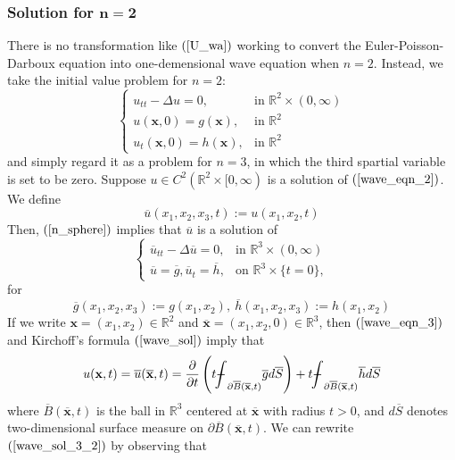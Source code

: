\documentclass[10pt]{article}
\def\rr{{\mathbb R}}
\def\vc{{\mathbf x}}
\def\so{{\overline u}}
\newcommand\tbbint{{-\mkern -16mu\int}}
\newcommand\dbbint{{-\mkern -19mu\int}}
\newcommand\bbint{
{\mathchoice{\dbbint}{\tbbint}{\tbbint}{\tbbint}}
}
\begin{document}
\subsubsection{Solution for $\mathbf{n=2}$}
There is no transformation like $(\ref{U_wa})$ working to convert the Euler-Poisson-Darboux equation into one-demensional wave equation when $n=2$. Instead, we take the initial value problem for $n=2$:
\begin{equation}
    \label{wave_eqn_2}
    \begin{cases}
        u_{tt} - \Delta u = 0, & \text{in } \rr^2 \times (0,\infty)\\
        u(\vc,0) = g(\vc), & \text{in } \rr^2\\
        u_t(\vc,0) = h(\vc), & \text{in } \rr^2
    \end{cases}
\end{equation}
and simply regard it as a problem for $n=3$, in which the third spartial variable is set to be zero. Suppose $u \in C^2(\rr^2 \times [0,\infty)$ is a solution of $(\ref{wave_eqn_2})$. We define
\begin{equation}
    \label{wave_sol_2}
    \so(x_1,x_2,x_3,t) := u(x_1,x_2,t)
\end{equation}
Then, $(\ref{n_sphere})$ implies that $\so$ is a solution of
\begin{equation}
    \label{wave_eqn_3}
    \begin{cases}
        \so_{tt} - \Delta \so = 0, & \text{in } \rr^3 \times (0,\infty)\\
        \so = \overline{g}, \so_t = \overline{h}, & \text{on } \rr^3 \times \{t=0\},
    \end{cases}
\end{equation}
for
\begin{equation*}
    \overline{g}(x_1,x_2,x_3) := g(x_1,x_2), \ \overline{h}(x_1,x_2,x_3) := h(x_1,x_2)
\end{equation*}
If we write $\vc = (x_1,x_2) \in \rr^2$ and $\overline{\vc}=(x_1,x_2,0) \in \rr^3$, then $(\ref{wave_eqn_3})$ and Kirchoff's formula $(\ref{wave_sol})$ imply that
\begin{equation}
    \label{wave_sol_3_2}
    u(\vc,t) = \so(\overline{\vc},t) = \frac{\partial }{\partial t}\left(t \bbint_{\partial \overline{B} (\overline{\vc},t)}\overline{g} d\overline{S}\right)+ t \bbint_{\partial \overline{B} (\overline{\vc},t)}\overline{h} d\overline{S}
\end{equation}
where $\overline{B}(\overline{\vc},t)$ is the ball in $\rr^3$ centered at $\overline{\vc}$ with radius $t>0$, and $d \overline{S}$ denotes two-dimensional surface measure on $\partial \overline{B}(\overline{\vc},t)$. We can rewrite $(\ref{wave_sol_3_2})$ by observing that
\end{document}
